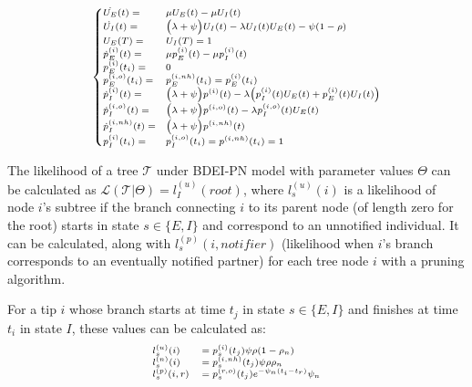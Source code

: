 \documentclass[a4paper,10pt]{article}
\begin{document}
\begin{equation}
\scriptsize
\begin{cases}
\dot{U_E}(t) = &\mu U_E(t)- \mu U_I(t)\\    
\dot{U_I}(t) = &\Big(\lambda + \psi\Big) U_I(t)- \lambda U_I(t)U_E(t)- \psi (1 - \rho)\\
U_E(T) = & U_I(T) = 1\\
\dot{p}_E^{(i)}(t) = & \mu p_E^{(i)}(t) - \mu p_I^{(i)}(t)\\
p_E^{(i)}(t_i) = & 0\\
p_E^{(i,o)}(t_i) = & p_E^{(i,nh)}(t_i) = p_E^{(i)}(t_i)\\
\dot{p}_I^{(i)}(t) = & \Big(\lambda + \psi\Big) p^{(i)}(t) - \lambda \Big(p_I^{(i)}(t)U_E(t) + p_E^{(i)}(t)U_I(t)\Big)\\
\dot{p}_I^{(i,o)}(t) = & \Big(\lambda + \psi\Big) p^{(i,o)}(t) - \lambda p_I^{(i,o)}(t)U_E(t)\\
\dot{p}_I^{(i,nh)}(t) = & \Big(\lambda + \psi\Big) p^{(i,nh)}(t)\\
p_I^{(i)}(t_i) = & p_I^{(i,o)}(t_i) = p^{(i,nh)}(t_i) = 1\label{eq:up-bd}
\end{cases}
\end{equation}

The likelihood of a tree $\mathscr{T}$ under BDEI-PN model with parameter values $\Theta$ can be calculated as $\mathscr{L}(\mathscr{T}|\Theta) = l_I^{(u)}(root)$, where $l_s^{(u)}(i)$ is a likelihood of node $i$'s subtree if the branch connecting $i$ to its parent node (of length zero for the root) starts in state $s \in \{E, I\}$ and correspond to an unnotified individual. It can be calculated, along with $l_s^{(p)}(i, notifier)$ (likelihood when $i$'s branch corresponds to an eventually notified partner) for each tree node $i$ with a pruning algorithm.


For a tip $i$ whose branch starts at time $t_j$ in state $s \in \{E, I\}$ and finishes at time $t_i$ in state $I$, these values can be calculated as:
\begin{equation}
\scriptsize
\begin{array}{ll}
l^{(u)}_{s}(i) &= p_s^{(i)}(t_j)\psi\rho (1-\rho_{n})\\
l^{(n)}_{s}(i) &= p_s^{(i,nh)}(t_j)\psi\rho \rho_{n}\\
l^{(p)}_{s}(i, r) &= p_s^{(r,o)}(t_j)e^{-\psi_n (t_i - t_r)}\psi_{n}\\
\end{array}
\end{equation}
\end{document}

